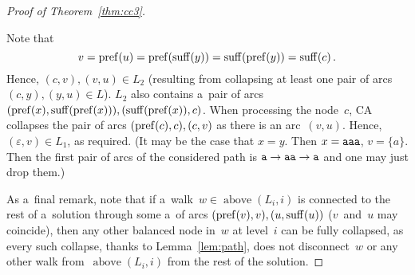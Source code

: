 \begin{proof}[Proof of Theorem~\ref{thm:cc3}]
\begin{description}
Note that 
\[v = \operatorname{pref}(u)=\operatorname{pref}(\operatorname{suff}(y))=\operatorname{suff}(\operatorname{pref}(y))=\operatorname{suff}(c) \, .\]
Hence, $(c,v), (v,u) \in L_2$ (resulting from collapsing at least one pair of arcs $(c,y), (y,u) \in L$). $L_2$ also contains a~pair of arcs $(\operatorname{pref}(x), \operatorname{suff}(\operatorname{pref}(x))), (\operatorname{suff}(\operatorname{pref}(x)), c)$. When processing the node~$c$, CA collapses the pair of arcs $(\operatorname{pref}(c), c), (c, v)$ as there is an arc~$(v,u)$.
Hence, $(\varepsilon, v) \in L_1$, as required. (It may be the case that $x=y$. Then $x={\tt aaa}$, $v=\{a\}$. Then the first pair of arcs of the considered path is ${\tt a} \to {\tt aa} \to {\tt a}$ and one may just drop them.)
\end{description}

As a~final remark, note that if a~walk~$w \in \operatorname{above}(L_i,i)$ is connected to the rest of a~solution through some a~of arcs $(\operatorname{pref}(v), v), (u, \operatorname{suff}(u))$ ($v$~and~$u$ may coincide), then any other balanced node in~$w$ at level~$i$ can be fully collapsed, as every such collapse, thanks to Lemma~\ref{lem:path}, does not disconnect~$w$ or any other walk from~$\operatorname{above}(L_i,i)$ from the rest of the solution.
\end{proof}
